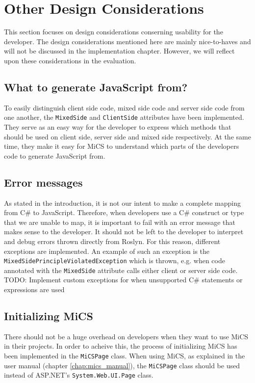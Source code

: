 \section{Other Design Considerations}
This section focuses on design considerations conserning usability for the developer. The design considerations mentioned here are mainly nice-to-haves and will not be discussed in the implementation chapter. However, we will reflect upon these considerations in the evaluation.

\subsection{What to generate JavaScript from?} %
\label{sub:what_to_generate_javascript_from}
	To easily distinguish client side code, mixed side code and server side code from one another, the \texttt{MixedSide} and \texttt{ClientSide} attributes have been implemented. They serve as an easy way for the developer to express which methods that should be used on client side, server side and mixed side respectively. At the same time, they make it easy for MiCS to understand which parts of the developers code to generate JavaScript from.


\subsection{Error messages} %
\label{sub:design_error_messages}
	As stated in the introduction, it is not our intent to make a complete mapping from C\# to JavaScript. Therefore, when developers use a C\# construct or type that we are unable to map, it is important to fail with an error message that makes sense to the developer. It should not be left to the developer to interpret and debug errors thrown directly from Roslyn. For this reason, different exceptions are implemented. An example of such an exception is the \texttt{MixedSidePrincipleViolatedException} which is thrown, e.g. when code annotated with the \texttt{MixedSide} attribute calls either client or server side code.
	TODO: Implement custom exceptions for when unsupported C\# statements or expressions are used


\subsection{Initializing MiCS} %
\label{sub:initializng_mics}
	There should not be a huge overhead on developers when they want to use MiCS in their projects. In order to acheive this, the process of initializing MiCS has been implemented in the \texttt{MiCSPage} class. When using MiCS, as explained in the user manual (chapter \ref{chap:mics_manual}), the \texttt{MiCSPage} class should be used instead of ASP.NET's \texttt{System.Web.UI.Page} class.
